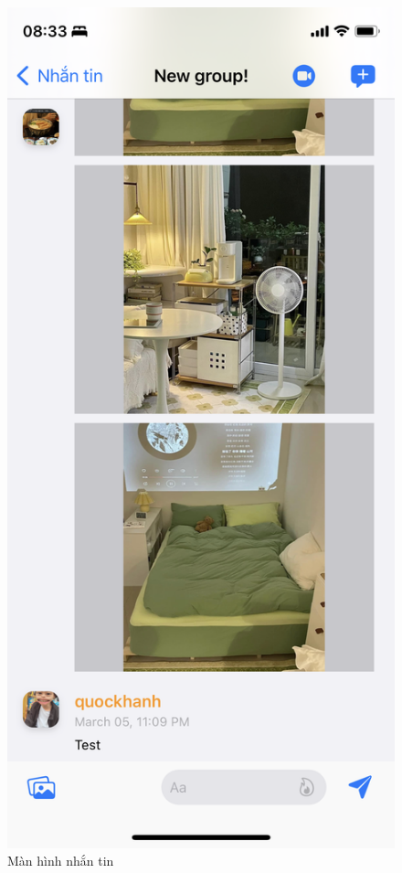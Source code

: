 \documentclass[../DoAn.tex]{subfiles}
\begin{document}
\begin{figure}[H]
    \centering
    \includegraphics[width=0.5\linewidth]{Hinhve/Application/Messaging.png}
    \caption{Màn hình nhắn tin}
    \label{fig:use_case_tổng_quan}
\end{figure}
\end{document}
